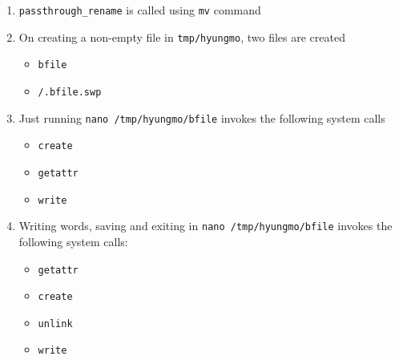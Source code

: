 \documentclass[12pt]{article}
\begin{document}
\begin{enumerate}[1.]
    \item \texttt{passthrough\_rename} is called using \texttt{mv} command
    \item On creating a non-empty file in \texttt{tmp/hyungmo}, two files are created

    \begin{itemize}
        \item \texttt{bfile}
        \item \texttt{/.bfile.swp}
    \end{itemize}


    \item Just running \texttt{nano /tmp/hyungmo/bfile} invokes the following system calls

    \begin{itemize}
        \item \texttt{create}
        \item \texttt{getattr}
        \item \texttt{write}
    \end{itemize}

    \item Writing words, saving and exiting in \texttt{nano /tmp/hyungmo/bfile} invokes the following system calls:

    \begin{itemize}
        \item \texttt{getattr}
        \item \texttt{create}
        \item \texttt{unlink}
        \item \texttt{write}
    \end{itemize}

\end{enumerate}
\end{document}
